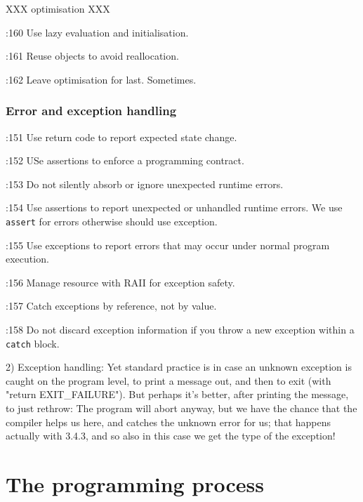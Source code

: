 \documentclass{book}
\newcommand{\name}[1]{\texttt{#1}}
\begin{document}
XXX optimisation XXX

\cite{OKL_MisfeldtBumgardnerGray2004CppStyle}:160 Use lazy evaluation and initialisation. 

\cite{OKL_MisfeldtBumgardnerGray2004CppStyle}:161 Reuse objects to avoid reallocation.

\cite{OKL_MisfeldtBumgardnerGray2004CppStyle}:162 Leave optimisation for last. Sometimes.




\section{Error and exception handling}
\label{sec:Error}

\cite{OKL_MisfeldtBumgardnerGray2004CppStyle}:151 Use return code to report expected state change. 

\cite{OKL_MisfeldtBumgardnerGray2004CppStyle}:152 USe assertions to enforce a programming contract. 

\cite{OKL_MisfeldtBumgardnerGray2004CppStyle}:153 Do not silently absorb or ignore unexpected runtime errors.

\cite{OKL_MisfeldtBumgardnerGray2004CppStyle}:154 Use assertions to report unexpected or unhandled runtime errors. We use \name{assert} for errors otherwise should use exception.

\cite{OKL_MisfeldtBumgardnerGray2004CppStyle}:155 Use exceptions to report errors that may occur under normal program execution. 

\cite{OKL_MisfeldtBumgardnerGray2004CppStyle}:156 Manage resource with RAII for exception safety.

\cite{OKL_MisfeldtBumgardnerGray2004CppStyle}:157 Catch exceptions by reference, not by value.

\cite{OKL_MisfeldtBumgardnerGray2004CppStyle}:158 Do not discard exception information if you throw a new exception within a \name{catch} block.   

2) Exception handling: Yet standard practice is in case an unknown
exception is caught on the program level, to print a message out,
and then to exit (with "return EXIT\_FAILURE"). But perhaps it's better,
after printing the message, to just rethrow: The program will abort
anyway, but we have the chance that the compiler helps us here, and
catches the unknown error for us; that happens actually with 3.4.3,
and so also in this case we get the type of the exception!




\part{The programming process}
\label{par:programmingprocess}
\end{document}
